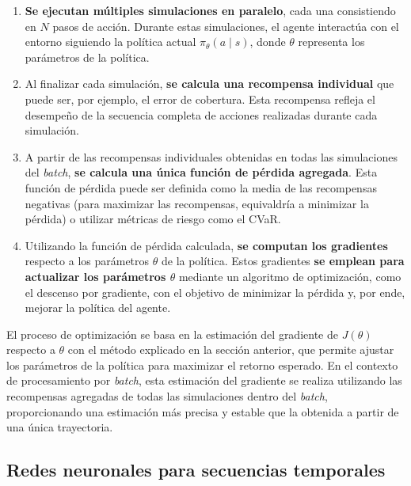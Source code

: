 \documentclass[11pt,a4paper,spanish]{article}
\numberwithin{equation}{section} %
\begin{document}
\begin{enumerate}
    \item \textbf{Se ejecutan múltiples simulaciones en paralelo}, cada una consistiendo en \( N \) pasos de acción. Durante estas simulaciones, el agente interactúa con el entorno siguiendo la política actual \(\pi_{\theta}(a \mid s)\), donde \(\theta\) representa los parámetros de la política.
    
    \item Al finalizar cada simulación, \textbf{se calcula una recompensa individual} que puede ser, por ejemplo, el error de cobertura. Esta recompensa refleja el desempeño de la secuencia completa de acciones realizadas durante cada simulación.
    
    \item A partir de las recompensas individuales obtenidas en todas las simulaciones del \textit{batch}, \textbf{se calcula una única función de pérdida agregada}. Esta función de pérdida puede ser definida como la media de las recompensas negativas (para maximizar las recompensas, equivaldría a minimizar la pérdida) o utilizar métricas de riesgo como el CVaR.
    
    \item Utilizando la función de pérdida calculada, \textbf{se computan los gradientes} respecto a los parámetros \(\theta\) de la política. Estos gradientes \textbf{se emplean para actualizar los parámetros \(\theta\)} mediante un algoritmo de optimización, como el descenso por gradiente, con el objetivo de minimizar la pérdida y, por ende, mejorar la política del agente.
\end{enumerate}

El proceso de optimización se basa en la estimación del gradiente de \( J(\theta) \) respecto a \(\theta\) con el método explicado en la sección anterior, que permite ajustar los parámetros de la política para maximizar el retorno esperado. En el contexto de procesamiento por \textit{batch}, esta estimación del gradiente se realiza utilizando las recompensas agregadas de todas las simulaciones dentro del \textit{batch}, proporcionando una estimación más precisa y estable que la obtenida a partir de una única trayectoria.

\medskip

\subsection{Redes neuronales para secuencias temporales}
\label{subsec:rnns}
\end{document}
